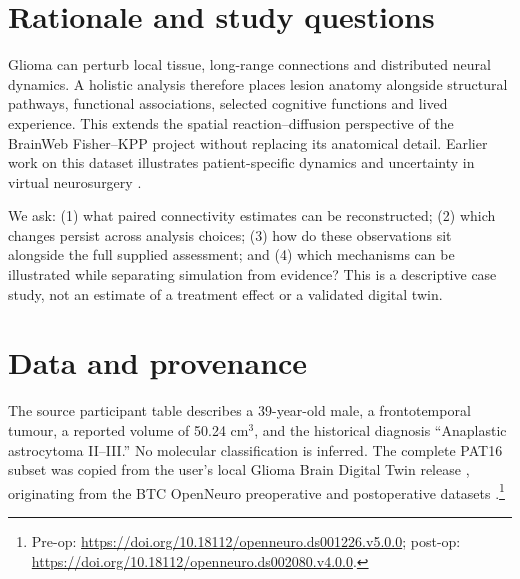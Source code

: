 \documentclass[11pt,a4paper]{article}
\begin{document}
\begin{abstract}
decreased, but worry and loneliness increased. These observations do not establish causal surgery effects or reliable cognitive improvement. Fifteen interactive notebooks, QC, sensitivity analyses and hypothetical network simulations provide a didactic research platform. Diffusion uses AP/PA topup and eddy; BOLD uses static field transfer with acquisition-specific geometry/readout. Unverified field compatibility, nuisance-model uncertainty, simplified registration/tractography and the two-session single-case design preclude clinical or predictive validation.
\end{abstract}

\section{Rationale and study questions}
Glioma can perturb local tissue, long-range connections and distributed neural dynamics. A holistic analysis therefore places lesion anatomy alongside structural pathways, functional associations, selected cognitive functions and lived experience. This extends the spatial reaction--diffusion perspective of the BrainWeb Fisher--KPP project \citep{fisherproject} without replacing its anatomical detail. Earlier work on this dataset illustrates patient-specific dynamics and uncertainty in virtual neurosurgery \citep{aerts2018,aerts2020}.

We ask: (1) what paired connectivity estimates can be reconstructed; (2) which changes persist across analysis choices; (3) how do these observations sit alongside the full supplied assessment; and (4) which mechanisms can be illustrated while separating simulation from evidence? This is a descriptive case study, not an estimate of a treatment effect or a validated digital twin.

\section{Data and provenance}
The source participant table describes a 39-year-old male, a frontotemporal tumour, a reported volume of 50.24 cm$^3$, and the historical diagnosis ``Anaplastic astrocytoma II--III.'' No molecular classification is inferred. The complete PAT16 subset was copied from the user's local Glioma Brain Digital Twin release \citep{lundervold2026}, originating from the BTC OpenNeuro preoperative and postoperative datasets \citep{aerts2022}.\footnote{Pre-op: \url{https://doi.org/10.18112/openneuro.ds001226.v5.0.0}; post-op: \url{https://doi.org/10.18112/openneuro.ds002080.v4.0.0}.}
\end{document}
